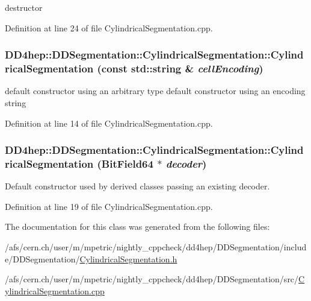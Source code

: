 destructor 

Definition at line 24 of file CylindricalSegmentation.cpp.\hypertarget{class_d_d4hep_1_1_d_d_segmentation_1_1_cylindrical_segmentation_afe34b42dad91d1b2fc50d21ecae094fe}{
\subsubsection[{CylindricalSegmentation}]{\setlength{\rightskip}{0pt plus 5cm}DD4hep::DDSegmentation::CylindricalSegmentation::CylindricalSegmentation (const std::string \& {\em cellEncoding})}}
\label{class_d_d4hep_1_1_d_d_segmentation_1_1_cylindrical_segmentation_afe34b42dad91d1b2fc50d21ecae094fe}


default constructor using an arbitrary type default constructor using an encoding string 

Definition at line 14 of file CylindricalSegmentation.cpp.\hypertarget{class_d_d4hep_1_1_d_d_segmentation_1_1_cylindrical_segmentation_ab523036ee9a48b8a7046c99b12cc8401}{
\subsubsection[{CylindricalSegmentation}]{\setlength{\rightskip}{0pt plus 5cm}DD4hep::DDSegmentation::CylindricalSegmentation::CylindricalSegmentation ({\bf BitField64} $\ast$ {\em decoder})}}
\label{class_d_d4hep_1_1_d_d_segmentation_1_1_cylindrical_segmentation_ab523036ee9a48b8a7046c99b12cc8401}


Default constructor used by derived classes passing an existing decoder. 

Definition at line 19 of file CylindricalSegmentation.cpp.

The documentation for this class was generated from the following files:\begin{DoxyCompactItemize}
\item 
/afs/cern.ch/user/m/mpetric/nightly\_\-cppcheck/dd4hep/DDSegmentation/include/DDSegmentation/\hyperlink{_cylindrical_segmentation_8h}{CylindricalSegmentation.h}\item 
/afs/cern.ch/user/m/mpetric/nightly\_\-cppcheck/dd4hep/DDSegmentation/src/\hyperlink{_cylindrical_segmentation_8cpp}{CylindricalSegmentation.cpp}\end{DoxyCompactItemize}
